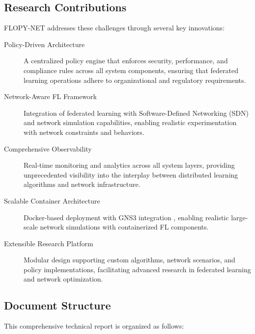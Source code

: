 \subsection{Research Contributions}

FLOPY-NET addresses these challenges through several key innovations:

\begin{description}
    \item[Policy-Driven Architecture] A centralized policy engine that enforces security, performance, and compliance rules across all system components, ensuring that federated learning operations adhere to organizational and regulatory requirements.
    
    \item[Network-Aware FL Framework] Integration of federated learning with Software-Defined Networking (SDN) \cite{kreutz2015software} and network simulation capabilities, enabling realistic experimentation with network constraints and behaviors.
    
    \item[Comprehensive Observability] Real-time monitoring and analytics across all system layers, providing unprecedented visibility into the interplay between distributed learning algorithms and network infrastructure.
    
    \item[Scalable Container Architecture] Docker-based deployment \cite{docker} with GNS3 integration \cite{gns3}, enabling realistic large-scale network simulations with containerized FL components.
    
    \item[Extensible Research Platform] Modular design supporting custom algorithms, network scenarios, and policy implementations, facilitating advanced research in federated learning and network optimization.
\end{description}

\subsection{Document Structure}

This comprehensive technical report is organized as follows:

